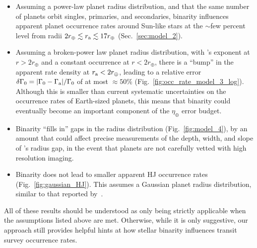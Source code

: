 \documentclass[12pt,modern]{aastex61}
\renewcommand{\a}{_{\rm a}}
\begin{document}
\begin{itemize}
%
\item Assuming a power-law planet radius distribution, and that the same 
number of planets orbit singles, primaries, and secondaries, binarity 
influences apparent planet occurrence rates around Sun-like stars at the 
$\sim$few percent level from radii $2r_\oplus \lesssim r\a \lesssim 
17r_\oplus$ (Sec.~\ref{sec:model_2}).
%
\item Assuming a broken-power law planet radius distribution, with 
\citet{howard_planet_2012}'s exponent at $r > 2r_\oplus$ and a constant 
occurrence at $r < 2r_\oplus$, there is a ``bump'' in the apparent rate 
density at $r\a < 2r_\oplus$, leading to a relative error $\delta \Gamma_0 = 
|\Gamma_0 - \Gamma\a|/\Gamma_0$ of at most $\approx 50\%$ 
(Fig.~\ref{fig:occ_rate_model_3_log}).
Although this is smaller than current systematic uncertainties on the 
occurrence rates of Earth-sized planets, this means that binarity could
eventually become an important component of the $\eta_\oplus$ error budget.
%
\item Binarity ``fills in'' gaps in the radius distribution 
(Fig.~\ref{fig:model_4}), by an amount that could affect precise measurements 
of the depth, width, and slope of \citet{fulton_california-_2017}'s radius 
gap, in the event that planets are not carefully vetted with high resolution 
imaging.
%
\item Binarity does not lead to smaller apparent HJ occurrence rates 
(Fig.~\ref{fig:gaussian_HJ}).
This assumes a Gaussian planet radius distribution, similar to that reported 
by~\citet{petigura_CKS_2017}.
\end{itemize}

All of these results should be understood as only being strictly applicable 
when the assumptions listed above are met.
Otherwise, while it is only suggestive, our approach still provides 
helpful hints at how stellar binarity influences transit survey occurrence 
rates.





\end{document}
